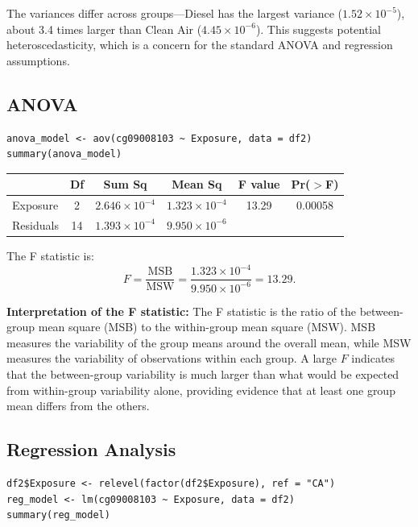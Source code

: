 \documentclass[11pt]{article}
\begin{document}
The variances differ across groups---Diesel has the largest variance ($1.52 \times 10^{-5}$), about 3.4 times larger than Clean Air ($4.45 \times 10^{-6}$). This suggests potential heteroscedasticity, which is a concern for the standard ANOVA and regression assumptions.

\subsection*{ANOVA}

\begin{lstlisting}
anova_model <- aov(cg09008103 ~ Exposure, data = df2)
summary(anova_model)
\end{lstlisting}

\begin{center}
\begin{tabular}{lccccc}
\toprule
 & Df & Sum Sq & Mean Sq & F value & Pr($>$F) \\
\midrule
Exposure & 2 & $2.646 \times 10^{-4}$ & $1.323 \times 10^{-4}$ & 13.29 & 0.00058 \\
Residuals & 14 & $1.393 \times 10^{-4}$ & $9.950 \times 10^{-6}$ & & \\
\bottomrule
\end{tabular}
\end{center}

The F statistic is:
\[
  F = \frac{\text{MSB}}{\text{MSW}} = \frac{1.323 \times 10^{-4}}{9.950 \times 10^{-6}} = 13.29.
\]

\textbf{Interpretation of the F statistic:} The F statistic is the ratio of the between-group mean square (MSB) to the within-group mean square (MSW). MSB measures the variability of the group means around the overall mean, while MSW measures the variability of observations within each group. A large $F$ indicates that the between-group variability is much larger than what would be expected from within-group variability alone, providing evidence that at least one group mean differs from the others.

\subsection*{Regression Analysis}

\begin{lstlisting}
df2$Exposure <- relevel(factor(df2$Exposure), ref = "CA")
reg_model <- lm(cg09008103 ~ Exposure, data = df2)
summary(reg_model)
\end{lstlisting}
\end{document}

